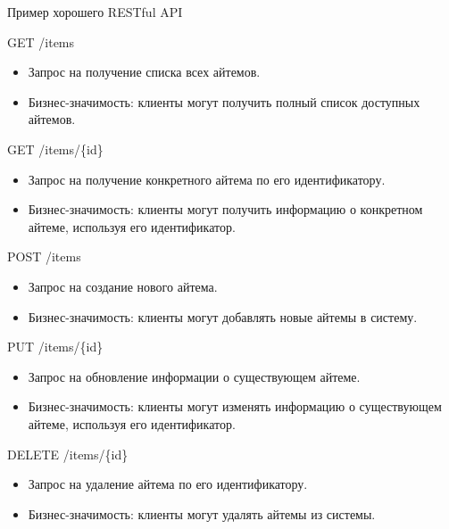 \documentclass[
  ignorenonframetext,
  aspectratio=169,
  aspectratio=169]{beamer}
\providecommand{\tightlist}{%
  \setlength{\itemsep}{0pt}\setlength{\parskip}{0pt}}
\begin{document}
\begin{frame}{Пример хорошего RESTful API}
\protect\hypertarget{ux43fux440ux438ux43cux435ux440-ux445ux43eux440ux43eux448ux435ux433ux43e-restful-api}{}
\begin{block}{GET /items}
\protect\hypertarget{get-items}{}
\begin{itemize}
\tightlist
\item
  Запрос на получение списка всех айтемов.
\item
  Бизнес-значимость: клиенты могут получить полный список доступных
  айтемов.
\end{itemize}
\end{block}

\begin{block}{GET /items/\{id\}}
\protect\hypertarget{get-itemsid}{}
\begin{itemize}
\tightlist
\item
  Запрос на получение конкретного айтема по его идентификатору.
\item
  Бизнес-значимость: клиенты могут получить информацию о конкретном
  айтеме, используя его идентификатор.
\end{itemize}
\end{block}

\begin{block}{POST /items}
\protect\hypertarget{post-items}{}
\begin{itemize}
\tightlist
\item
  Запрос на создание нового айтема.
\item
  Бизнес-значимость: клиенты могут добавлять новые айтемы в систему.
\end{itemize}
\end{block}

\begin{block}{PUT /items/\{id\}}
\protect\hypertarget{put-itemsid}{}
\begin{itemize}
\tightlist
\item
  Запрос на обновление информации о существующем айтеме.
\item
  Бизнес-значимость: клиенты могут изменять информацию о существующем
  айтеме, используя его идентификатор.
\end{itemize}
\end{block}

\begin{block}{DELETE /items/\{id\}}
\protect\hypertarget{delete-itemsid}{}
\begin{itemize}
\tightlist
\item
  Запрос на удаление айтема по его идентификатору.
\item
  Бизнес-значимость: клиенты могут удалять айтемы из системы.
\end{itemize}
\end{block}
\end{frame}
\end{document}
